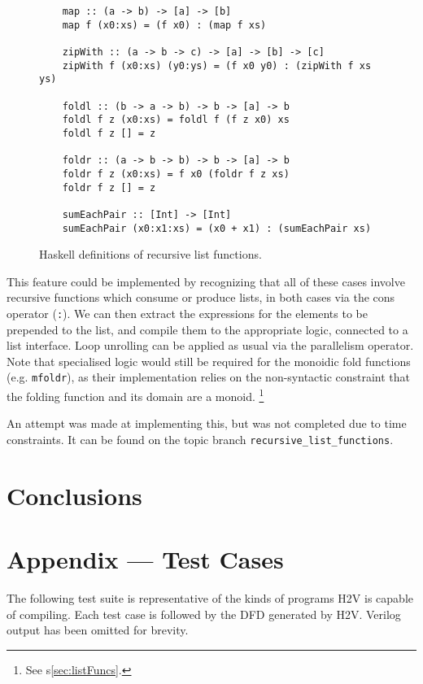 \documentclass[english,onecolumn]{scrartcl}
\begin{document}
\begin{figure}
\begin{lstlisting}
    map :: (a -> b) -> [a] -> [b]
    map f (x0:xs) = (f x0) : (map f xs)

    zipWith :: (a -> b -> c) -> [a] -> [b] -> [c]
    zipWith f (x0:xs) (y0:ys) = (f x0 y0) : (zipWith f xs ys)

    foldl :: (b -> a -> b) -> b -> [a] -> b
    foldl f z (x0:xs) = foldl f (f z x0) xs
    foldl f z [] = z

    foldr :: (a -> b -> b) -> b -> [a] -> b
    foldr f z (x0:xs) = f x0 (foldr f z xs)
    foldr f z [] = z

    sumEachPair :: [Int] -> [Int]
    sumEachPair (x0:x1:xs) = (x0 + x1) : (sumEachPair xs)
\end{lstlisting}
\caption{Haskell definitions of recursive list functions.\label{lst:recListFuncs}}
\end{figure}

This feature could be implemented by recognizing that all of these cases involve recursive functions which consume or produce
lists, in both cases via the cons operator (\texttt{:}). We can then extract the expressions for the elements to be prepended to
the list, and compile them to the appropriate logic, connected to a list interface. Loop unrolling can be applied as usual via the
parallelism operator. Note that specialised logic would still be required for the monoidic fold functions (e.g. \texttt{mfoldr}),
as their implementation relies on the non-syntactic constraint that the folding function and its domain are a monoid.%
\footnote{See s\ref{sec:listFuncs}.}

An attempt was made at implementing this, but was not completed due to time constraints. It can be found on the topic branch
\texttt{recursive\_list\_functions}.

\section{Conclusions}


\pagebreak{}
\appendix
\section{Appendix --- Test Cases}
The following test suite is representative of the kinds of programs H2V is capable of compiling. Each test case is followed by the
DFD generated by H2V. Verilog output has been omitted for brevity.
\end{document}
